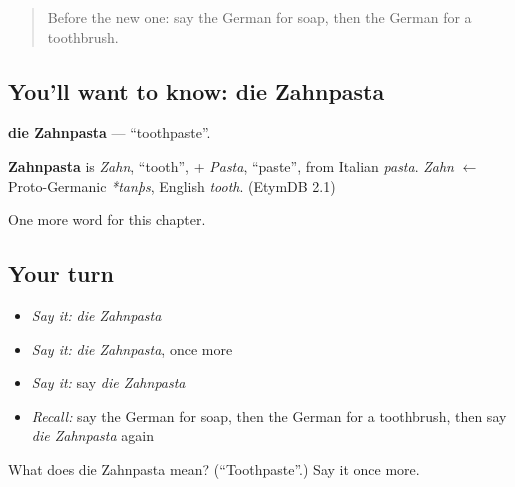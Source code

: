 \label{lesson:GE-C114-zahnpasta}



\begin{quote}
Before the new one: say the German for soap, then the German for a toothbrush.
\end{quote}

\subsection*{You'll want to know: die Zahnpasta}
\textbf{die Zahnpasta} — \textquotedblleft{}toothpaste\textquotedblright{}.

\begin{cousinweb}
\textbf{Zahnpasta} is \emph{Zahn}, \textquotedblleft{}tooth\textquotedblright{}, + \emph{Pasta}, \textquotedblleft{}paste\textquotedblright{}, from Italian \emph{pasta}. \emph{Zahn} $\leftarrow$ Proto-Germanic \emph{*tanþs}, English \emph{tooth}. (EtymDB 2.1)
\end{cousinweb}

\begin{grammarlens}[title={What you've built}]
One more word for this chapter.
\end{grammarlens}

\subsection*{Your turn}
\begin{itemize}
\raggedright
  \item \emph{Say it:} \emph{die Zahnpasta}
  \item \emph{Say it:} \emph{die Zahnpasta}, once more
  \item \emph{Say it:} say \emph{die Zahnpasta}
  \item \emph{Recall:} say the German for soap, then the German for a toothbrush, then say \emph{die Zahnpasta} again
\end{itemize}

\begin{tcolorbox}[breakable,colback=teal!4,colframe=teal!35!black,title={Before you move on}]
What does die Zahnpasta mean? (\textquotedblleft{}Toothpaste\textquotedblright{}.) Say it once more.
\end{tcolorbox}
